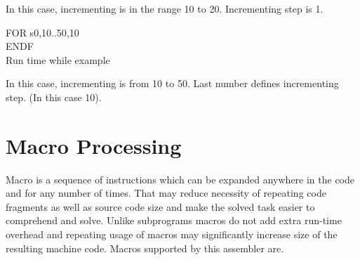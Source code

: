                     In this case, incrementing is in the range 10 to 20. Incrementing step is 1.
                            \begin{code}[h!]
                                    { \color{highlight_directive} FOR  }
                                    { \color{highlight_constant}   s0,10..50,10 }\\
                                    { \color{highlight_directive}  ENDF}\\
                                \caption{Run time while example}
                            \end{code}
                    In this case, incrementing is from 10 to 50. Last number defines incrementing step. (In this case 10).

        \section{Macro Processing}
                Macro is a sequence of instructions which can be expanded anywhere in the code and for any number of times. That may reduce necessity of
                repeating code fragments as well as source code size and make the solved task easier to comprehend and solve. Unlike subprograms macros do
                not add extra run-time overhead and repeating usage of macros may significantly increase size of the resulting machine code. Macros supported
                by this assembler are.

